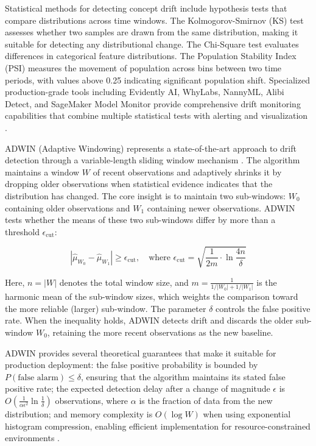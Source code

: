 Statistical methods for detecting concept drift include hypothesis tests that compare distributions across time windows. The Kolmogorov-Smirnov (KS) test assesses whether two samples are drawn from the same distribution, making it suitable for detecting any distributional change. The Chi-Square test evaluates differences in categorical feature distributions. The Population Stability Index (PSI) measures the movement of population across bins between two time periods, with values above 0.25 indicating significant population shift. Specialized production-grade tools including Evidently AI, WhyLabs, NannyML, Alibi Detect, and SageMaker Model Monitor provide comprehensive drift monitoring capabilities that combine multiple statistical tests with alerting and visualization \citep{adwin2025}.

ADWIN (Adaptive Windowing) represents a state-of-the-art approach to drift detection through a variable-length sliding window mechanism \citep{bifet2007learning, adwin2025}. The algorithm maintains a window $W$ of recent observations and adaptively shrinks it by dropping older observations when statistical evidence indicates that the distribution has changed. The core insight is to maintain two sub-windows: $W_0$ containing older observations and $W_1$ containing newer observations. ADWIN tests whether the means of these two sub-windows differ by more than a threshold $\epsilon_{\text{cut}}$:

\begin{equation}
|\hat{\mu}_{W_0} - \hat{\mu}_{W_1}| \geq \epsilon_{\text{cut}}, \quad \text{where } \epsilon_{\text{cut}} = \sqrt{\frac{1}{2m} \cdot \ln \frac{4n}{\delta}}
\end{equation}

Here, $n = |W|$ denotes the total window size, and $m = \frac{1}{1/|W_0| + 1/|W_1|}$ is the harmonic mean of the sub-window sizes, which weights the comparison toward the more reliable (larger) sub-window. The parameter $\delta$ controls the false positive rate. When the inequality holds, ADWIN detects drift and discards the older sub-window $W_0$, retaining the more recent observations as the new baseline.

ADWIN provides several theoretical guarantees that make it suitable for production deployment: the false positive probability is bounded by $P(\text{false alarm}) \leq \delta$, ensuring that the algorithm maintains its stated false positive rate; the expected detection delay after a change of magnitude $\epsilon$ is $O\left(\frac{1}{\alpha \epsilon^2} \ln \frac{1}{\delta}\right)$ observations, where $\alpha$ is the fraction of data from the new distribution; and memory complexity is $O(\log W)$ when using exponential histogram compression, enabling efficient implementation for resource-constrained environments \citep{bifet2007learning}.

